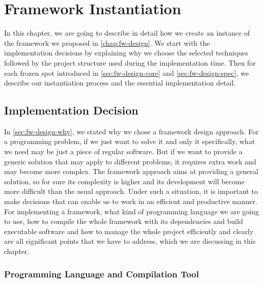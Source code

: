 \chapter{Framework Instantiation}
\label{chap:fw-inst}

\vspace*{-5mm}

In this chapter, we are going to describe in detail how we create an instance
of the framework we proposed in \autoref{chap:fw-design}. We start with the
implementation decisions by explaining why we choose the selected techniques
followed by the project structure used during the implementation time.
Then for each frozen spot introduced in \autoref{sec:fw-design-core} and
\autoref{sec:fw-design-spec}, we describe our instantiation process and the
essential implementation detail.

\vspace*{-2mm}
\section{Implementation Decision}
\label{sec:fw-inst-impl}
\vspace*{-2mm}

In \autoref{sec:fw-design-why}, we stated why we chose a framework design
approach. For a programming problem, if we just want to solve it and only it 
specifically, what we need may be just a piece of regular software. But if we want to
provide a generic solution that may apply to different problems, it requires extra work and may become more
complex. The framework approach aims at providing a general solution, so for
sure its complexity is higher and its development will become more difficult
than the usual approach.
Under such a situation, it is important to make decisions that can enable us to
work in an efficient and productive manner. For implementing a framework, what kind of
programming language we are going to use, how to compile the whole framework
with its dependencies and build executable software and how to manage the whole
project efficiently and clearly are all significant points that we have to address, 
which we are discussing in this chapter.

\subsection{Programming Language and Compilation Tool}
\label{sec:fw-inst-lang-ct}

